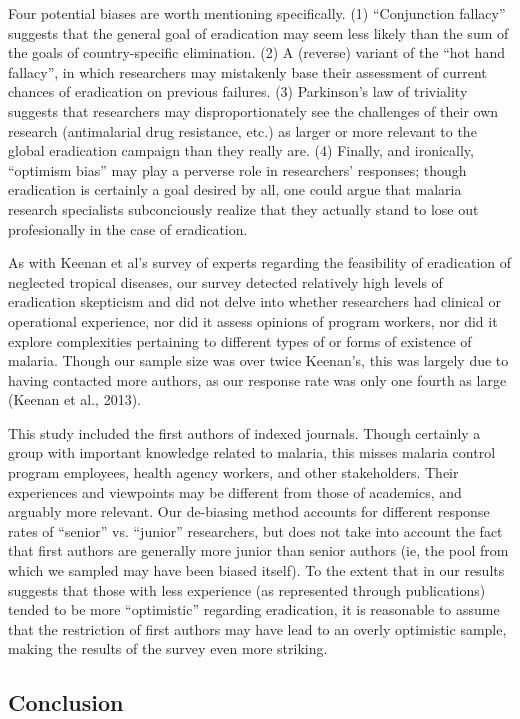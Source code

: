 \documentclass[]{article}
\begin{document}
Four potential biases are worth mentioning specifically. (1)
``Conjunction fallacy'' suggests that the general goal of eradication
may seem less likely than the sum of the goals of country-specific
elimination. (2) A (reverse) variant of the ``hot hand fallacy'', in
which researchers may mistakenly base their assessment of current
chances of eradication on previous failures. (3) Parkinson's law of
triviality suggests that researchers may disproportionately see the
challenges of their own research (antimalarial drug resistance, etc.) as
larger or more relevant to the global eradication campaign than they
really are. (4) Finally, and ironically, ``optimism bias'' may play a
perverse role in researchers' responses; though eradication is certainly
a goal desired by all, one could argue that malaria research specialists
subconciously realize that they actually stand to lose out profesionally
in the case of eradication.

As with Keenan et al's survey of experts regarding the feasibility of
eradication of neglected tropical diseases, our survey detected
relatively high levels of eradication skepticism and did not delve into
whether researchers had clinical or operational experience, nor did it
assess opinions of program workers, nor did it explore complexities
pertaining to different types of or forms of existence of malaria.
Though our sample size was over twice Keenan's, this was largely due to
having contacted more authors, as our response rate was only one fourth
as large (Keenan et al., 2013).

This study included the first authors of indexed journals. Though
certainly a group with important knowledge related to malaria, this
misses malaria control program employees, health agency workers, and
other stakeholders. Their experiences and viewpoints may be different
from those of academics, and arguably more relevant. Our de-biasing
method accounts for different response rates of ``senior'' vs.
``junior'' researchers, but does not take into account the fact that
first authors are generally more junior than senior authors (ie, the
pool from which we sampled may have been biased itself). To the extent
that in our results suggests that those with less experience (as
represented through publications) tended to be more ``optimistic''
regarding eradication, it is reasonable to assume that the restriction
of first authors may have lead to an overly optimistic sample, making
the results of the survey even more striking.

\subsection{Conclusion}\label{conclusion}
\end{document}

